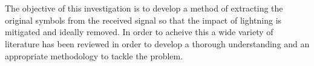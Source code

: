 \\\\
The objective of this investigation is to develop a method of extracting the original symbols from the received signal so that the impact of lightning is mitigated and ideally removed. In order to acheive this a wide variety of literature has been reviewed in order to develop a thorough understanding and an appropriate methodology to tackle the problem. 


